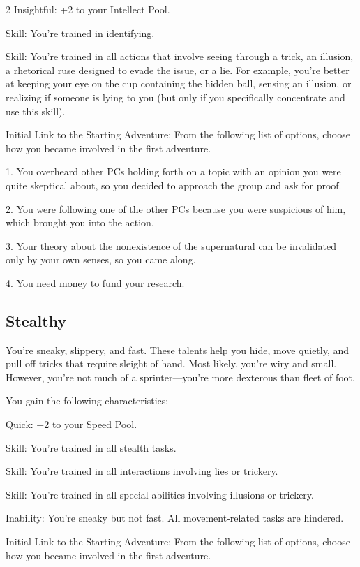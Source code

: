 \begin{multicols}{2}
Insightful: +2 to your Intellect Pool.

Skill: You’re trained in identifying.

Skill: You’re trained in all actions that involve seeing through a trick, an illusion, a rhetorical ruse designed to evade the issue, or a lie. For example, you’re better at keeping your eye on the cup containing the hidden ball, sensing an illusion, or realizing if someone is lying to you (but only if you specifically concentrate and use this skill).

Initial Link to the Starting Adventure: From the following list of options, choose how you became involved in the first adventure.

1. You overheard other PCs holding forth on a topic with an opinion you were quite skeptical about, so you decided to approach the group and ask for proof.

2. You were following one of the other PCs because you were suspicious of him, which brought you into the action.

3. Your theory about the nonexistence of the supernatural can be invalidated only by your own senses, so you came along.

4. You need money to fund your research.

\subsection{Stealthy}

You’re sneaky, slippery, and fast. These talents help you hide, move quietly, and pull off tricks that require sleight of hand. Most likely, you’re wiry and small. However, you’re not much of a sprinter—you’re more dexterous than fleet of foot.

You gain the following characteristics:

Quick: +2 to your Speed Pool.

Skill: You’re trained in all stealth tasks.

Skill: You’re trained in all interactions involving lies or trickery.

Skill: You’re trained in all special abilities involving illusions or trickery.

Inability: You’re sneaky but not fast. All movement-related tasks are hindered.

Initial Link to the Starting Adventure: From the following list of options, choose how you became involved in the first adventure.


\end{multicols}
